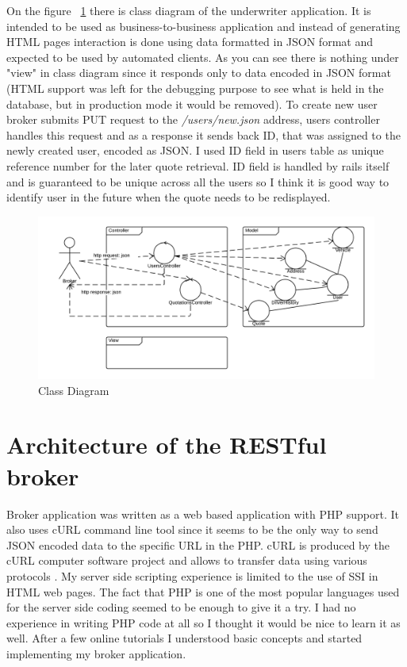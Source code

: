 \documentclass[10pt,a4paper,headinclude=true,twoside]{report}
\begin{document}
On the figure ~\ref{fig:ClassDesign} there is class diagram of the underwriter application. It is intended to be used as business-to-business application and instead of generating HTML pages interaction is done using data formatted in JSON format and expected to be used by automated clients. As you can see there is nothing under "view" in class diagram since it responds only to data encoded in JSON format (HTML support was left for the debugging purpose to see what is held in the database, but in production mode it would be removed). To create new user broker submits PUT request to the \textit{/users/new.json} address, users controller handles this request and as a response it sends back ID, that was assigned to the newly created user, encoded as JSON. I used ID field in users table as unique reference number for the later quote retrieval. ID field is handled by rails itself and is guaranteed to be unique across all the users so I think it is good way to identify user in the future when the quote needs to be redisplayed. 

\begin{figure}[H]
\centering
\centerline{\includegraphics[scale=0.25]{./ClassDesign}}
\caption{Class Diagram}
\label{fig:ClassDesign}
\end{figure}


\section{Architecture of the RESTful broker}
Broker application was written as a web based application with PHP support. It also uses cURL command line tool since it seems to be the only way to send JSON encoded data to the specific URL in the PHP. cURL is produced by the cURL computer software project and allows to transfer data using various protocols \cite{cURL}. My server side scripting experience is limited to the use of SSI in HTML web pages. The fact that PHP is one of the most popular languages used for the server side coding \cite{PHP} seemed to be enough to give it a try. I had no experience in writing PHP code at all so I thought it would be nice to learn it as well. After a few online tutorials I understood basic concepts and started implementing my broker application.
\end{document}
